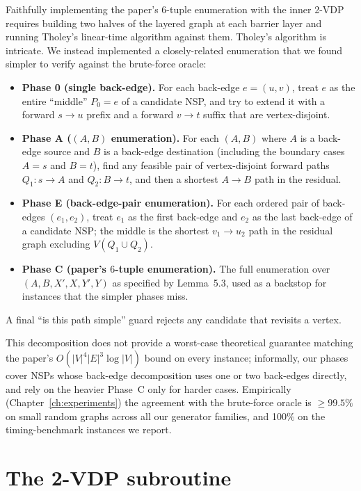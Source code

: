 Faithfully implementing the paper's $6$-tuple enumeration with the inner
2-VDP requires building two halves of the layered graph at each barrier
layer and running Tholey's linear-time algorithm against them. Tholey's
algorithm is intricate. We instead implemented a closely-related enumeration
that we found simpler to verify against the brute-force oracle:
\begin{itemize}
  \item \textbf{Phase 0 (single back-edge).} For each back-edge $e=(u,v)$,
    treat $e$ as the entire ``middle'' $P_0=e$ of a candidate NSP, and try
    to extend it with a forward $s\to u$ prefix and a forward $v\to t$
    suffix that are vertex-disjoint.
  \item \textbf{Phase A ($(A,B)$ enumeration).} For each $(A,B)$ where $A$
    is a back-edge source and $B$ is a back-edge destination (including
    the boundary cases $A=s$ and $B=t$), find any feasible pair of
    vertex-disjoint forward paths $Q_1:s\to A$ and $Q_2:B\to t$, and then a
    shortest $A\to B$ path in the residual.
  \item \textbf{Phase E (back-edge-pair enumeration).} For each ordered
    pair of back-edges $(e_1,e_2)$, treat $e_1$ as the first back-edge and
    $e_2$ as the last back-edge of a candidate NSP; the middle is the
    shortest $v_1\to u_2$ path in the residual graph excluding $V(Q_1\cup
    Q_2)$.
  \item \textbf{Phase C (paper's $6$-tuple enumeration).} The full
    enumeration over $(A,B,X',X,Y',Y)$ as specified by Lemma~5.3, used as
    a backstop for instances that the simpler phases miss.
\end{itemize}
A final ``is this path simple'' guard rejects any candidate that revisits a
vertex.

This decomposition does not provide a worst-case theoretical guarantee
matching the paper's $O(|V|^{4}|E|^{3}\log|V|)$ bound on every instance;
informally, our phases cover NSPs whose back-edge decomposition uses one or
two back-edges directly, and rely on the heavier Phase~C only for harder
cases. Empirically (Chapter~\ref{ch:experiments}) the agreement with the
brute-force oracle is $\ge 99.5\%$ on small random graphs across all our
generator families, and 100\% on the timing-benchmark instances we report.

\section{The 2-VDP subroutine}

